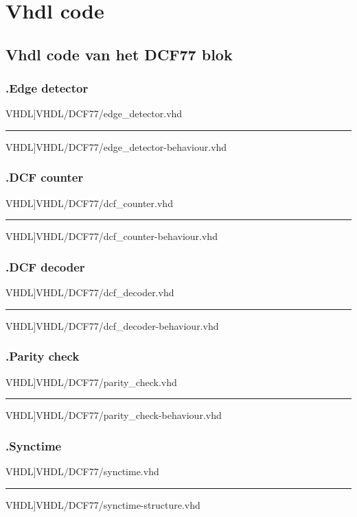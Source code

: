 \chapter[VHDL code]{Vhdl code}
\section{Vhdl code van het DCF77 blok}
\label{Ap: DCF_code}
\subsection*{\label{code: edge_detector}\thesubsection.\quad Edge detector}
\scriptsize 
 VHDL]{VHDL/DCF77/edge_detector.vhd}
\hrule
 VHDL]{VHDL/DCF77/edge_detector-behaviour.vhd}
\normalsize
\newpage

\subsection*{\label{code: dcf_counter}\thesubsection.\quad DCF counter}
\scriptsize 
 VHDL]{VHDL/DCF77/dcf_counter.vhd}
\hrule
 VHDL]{VHDL/DCF77/dcf_counter-behaviour.vhd}
\normalsize

\subsection*{\label{code: dcf_decoder}\thesubsection.\quad DCF decoder}
\scriptsize 
 VHDL]{VHDL/DCF77/dcf_decoder.vhd}
\hrule
 VHDL]{VHDL/DCF77/dcf_decoder-behaviour.vhd}
\normalsize

\subsection*{\label{code: parity_check}\thesubsection.\quad Parity check}
\scriptsize 
 VHDL]{VHDL/DCF77/parity_check.vhd}
\hrule
 VHDL]{VHDL/DCF77/parity_check-behaviour.vhd}
\normalsize

\subsection*{\label{code: synctime}\thesubsection.\quad Synctime}
\scriptsize 
 VHDL]{VHDL/DCF77/synctime.vhd}
\hrule
 VHDL]{VHDL/DCF77/synctime-structure.vhd}
\normalsize

